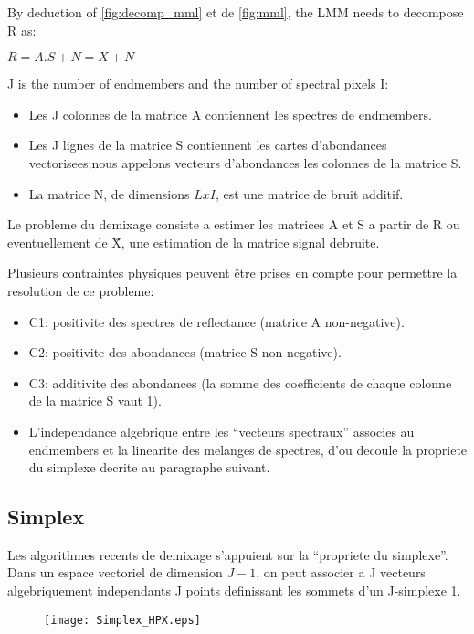 By deduction of \ref{fig:decomp_mml} et de \ref{fig:mml}, the LMM needs to decompose R as: 
\begin{center}
$R= A.S + N = X + N$
\end{center}

J is the number of endmembers and the number of spectral pixels I:
 
\begin{itemize}
\item{Les J colonnes de la matrice A contiennent les spectres de endmembers.}
\item{Les J lignes de la matrice S contiennent les cartes d'abondances
vectorisees;nous appelons vecteurs d'abondances les colonnes de la
matrice S.}
\item{La matrice N, de dimensions $LxI$, est une matrice de bruit
additif.}
\end{itemize}

   

Le probleme du demixage consiste a estimer les matrices A et S a
partir de R ou eventuellement de \"X, une estimation de la matrice signal
debruite.

Plusieurs contraintes physiques peuvent être prises en
compte pour permettre la resolution de ce probleme: 
\begin{itemize}
\item{C1: positivite
des spectres de reflectance (matrice A non-negative).}
\item{C2: positivite
des abondances (matrice S non-negative).}
\item{C3: additivite des
abondances (la somme des coefficients de chaque colonne de la matrice
S vaut 1).}
\item{L'independance algebrique entre les ``vecteurs spectraux''
associes au endmembers et la linearite des melanges de spectres, d'ou
decoule la propriete du simplexe decrite au paragraphe suivant.}
\end{itemize}

\subsection{Simplex}  
Les algorithmes recents de demixage s'appuient sur la ``propriete du
simplexe''. Dans un espace vectoriel de dimension $J-1$, on peut
associer a J vecteurs algebriquement independants J points definissant
les sommets d'un J-simplexe \ref{fig:simplex}.

\begin{figure}[h]
  \centering
  \texttt{[image: Simplex\_HPX.eps]}
  \label{fig:simplex}
\end{figure}

